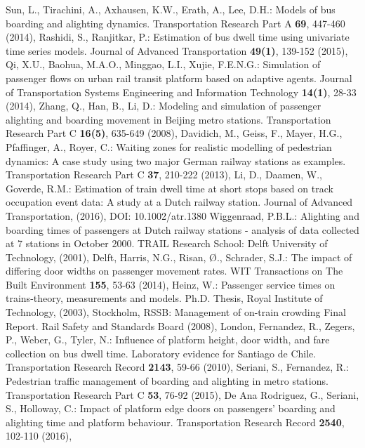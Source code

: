 \begin{thebibliography}{1}
    Sun, L., Tirachini, A., Axhausen, K.W., Erath, A., Lee, D.H.: Models of bus boarding and alighting dynamics. Transportation Research Part A \textbf{69}, 447-460 (2014), 
    Rashidi, S., Ranjitkar, P.: Estimation of bus dwell time using univariate time series models. Journal of Advanced Transportation \textbf{49(1)}, 139-152 (2015), 
    Qi, X.U., Baohua, M.A.O., Minggao, L.I., Xujie, F.E.N.G.: Simulation of passenger flows on urban rail transit platform based on adaptive agents. Journal of Transportation Systems Engineering and Information Technology \textbf{14(1)}, 28-33 (2014), 
    Zhang, Q., Han, B., Li, D.: Modeling and simulation of passenger alighting and boarding movement in Beijing metro stations. Transportation Research Part C \textbf{16(5)}, 635-649 (2008), 
    Davidich, M., Geiss, F., Mayer, H.G., Pfaffinger, A., Royer, C.: Waiting zones for realistic modelling of pedestrian dynamics: A case study using two major German railway stations as examples. Transportation Research Part C \textbf{37}, 210-222 (2013), 
    Li, D., Daamen, W., Goverde, R.M.: Estimation of train dwell time at short stops based on track occupation event data: A study at a Dutch railway station. Journal of Advanced Transportation, (2016), DOI: 10.1002/atr.1380
    Wiggenraad, P.B.L.: Alighting and boarding times of passengers at Dutch railway stations - analysis of data collected at 7 stations in October 2000. TRAIL Research School: Delft University of Technology, (2001), Delft, 
    Harris, N.G., Risan, Ø., Schrader, S.J.: The impact of differing door widths on passenger movement rates. WIT Transactions on The Built Environment  \textbf{155}, 53-63 (2014), 
    Heinz, W.: Passenger service times on trains-theory, measurements and models. Ph.D. Thesis, Royal Institute of Technology, (2003), Stockholm, 
    RSSB: Management of on-train crowding Final Report. Rail Safety and Standards Board (2008), London,
    Fernandez, R., Zegers, P., Weber, G., Tyler, N.: Influence of platform height, door width, and fare collection on bus dwell time. Laboratory evidence for Santiago de Chile. Transportation Research Record \textbf{2143}, 59-66 (2010), 
    Seriani, S., Fernandez, R.: Pedestrian traffic management of boarding and alighting in metro stations. Transportation Research Part C \textbf{53}, 76-92 (2015), 
    De Ana Rodriguez, G., Seriani, S., Holloway, C.: Impact of platform edge doors on passengers’ boarding and alighting time and platform behaviour. Transportation Research Record \textbf{2540}, 102-110 (2016), 

\end{thebibliography}
